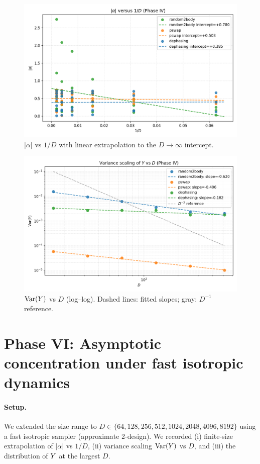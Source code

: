 \begin{figure}[h]
\centering
\includegraphics[width=0.78\linewidth]{../figures/phase4_alpha_vs_invD.png}
\caption{$|\alpha|$ vs $1/D$ with linear extrapolation to the $D\to\infty$ intercept.}
\end{figure}

\begin{figure}[h]
\centering
\includegraphics[width=0.78\linewidth]{../figures/phase4_varY_scaling.png}
\caption{$\mathrm{Var}(Y)$ vs $D$ (log--log). Dashed lines: fitted slopes; gray: $D^{-1}$ reference.}
\end{figure}

\section{Phase VI: Asymptotic concentration under fast isotropic dynamics}

\paragraph{Setup.}
We extended the size range to $D\in\{64,128,256,512,1024,2048,4096,8192\}$ using a fast isotropic sampler (approximate 2-design). We recorded (i) finite-size extrapolation of $|\alpha|$ vs $1/D$, (ii) variance scaling $\mathrm{Var}(Y)$ vs $D$, and (iii) the distribution of $Y$ at the largest $D$.

